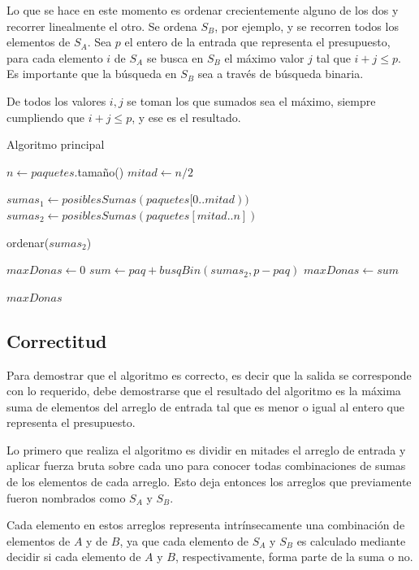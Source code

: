 Lo que se hace en este momento es ordenar crecientemente alguno de los dos y
recorrer linealmente el otro. Se ordena $S_B$, por ejemplo, y se recorren todos
los elementos de $S_A$. Sea $p$ el entero de la entrada que representa el
presupuesto, para cada elemento $i$ de $S_A$ se busca en $S_B$ el máximo valor
$j$ tal que $i + j \leq p$. Es importante que la búsqueda en $S_B$ sea a través
de búsqueda binaria.

De todos los valores $i,j$ se toman los que sumados sea el máximo, siempre
cumpliendo que $i + j \leq p$, y ese es el resultado.

\bigskip

\begin{algorithm}[H]
	\caption{Algoritmo principal}
    $n \gets paquetes$.tamaño() \;
	$mitad \gets n / 2$ \;

	$sumas_1 \gets posiblesSumas(paquetes[0..mitad))$ \;
	$sumas_2 \gets posiblesSumas(paquetes[mitad..n])$ \;

	ordenar($sumas_2$) \;

	$maxDonas \gets 0$ \;
	 {
		 {
			$sum \gets paq + busqBin(sumas_2, p - paq)$ \;
			 {
				$maxDonas \gets sum$ \;
			}
		}
	}

	\Return $maxDonas$ \;
\end{algorithm}

\subsection{Correctitud}

Para demostrar que el algoritmo es correcto, es decir que la salida se
corresponde con lo requerido, debe demostrarse que el resultado del algoritmo es
la máxima suma de elementos del arreglo de entrada tal que es menor o igual al
entero que representa el presupuesto.

Lo primero que realiza el algoritmo es dividir en mitades el arreglo de entrada
y aplicar fuerza bruta sobre cada uno para conocer todas combinaciones de sumas
de los elementos de cada arreglo. Esto deja entonces los arreglos que
previamente fueron nombrados como $S_A$ y $S_B$.

Cada elemento en estos arreglos representa intrínsecamente una combinación de elementos de $A$ y de $B$, ya que cada elemento de $S_A$ y $S_B$ es calculado mediante decidir si cada elemento de $A$ y $B$, respectivamente, forma parte de la suma o no.

